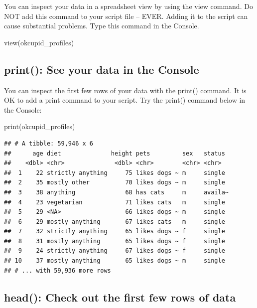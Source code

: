 \documentclass[
]{krantz}
\makeatletter
\newenvironment{Shaded}{\begin{snugshade}}{\end{snugshade}}
\newcommand{\FunctionTok}[1]{\textcolor[rgb]{0,0,0}{#1}}
\newcommand{\NormalTok}[1]{#1}
\newenvironment{kframe}{%
\medskip{}
\setlength{\fboxsep}{.8em}
 \def\at@end@of@kframe{}%
 \ifinner\ifhmode%
  \def\at@end@of@kframe{\end{minipage}}%
  \begin{minipage}{\columnwidth}%
 \fi\fi%
 \def\FrameCommand##1{\hskip\@totalleftmargin \hskip-\fboxsep
 \colorbox{shadecolor}{##1}\hskip-\fboxsep
     \hskip-\linewidth \hskip-\@totalleftmargin \hskip\columnwidth}%
 \MakeFramed {\advance\hsize-\width
   \@totalleftmargin\z@ \linewidth\hsize
   \@setminipage}}%
 {\par\unskip\endMakeFramed%
 \at@end@of@kframe}
\renewenvironment{Shaded}{\begin{kframe}}{\end{kframe}}
\makeatother
\begin{document}
You can inspect your data in a spreadsheet view by using the view command. Do NOT add this command to your script file -- EVER. Adding it to the script can cause substantial problems. Type this command in the Console.

\begin{Shaded}
\begin{Highlighting}[]
\FunctionTok{view}\NormalTok{(okcupid\_profiles)}
\end{Highlighting}
\end{Shaded}

\hypertarget{print-see-your-data-in-the-console}{%
\subsection{print(): See your data in the Console}\label{print-see-your-data-in-the-console}}

You can inspect the first few rows of your data with the print() command. It is OK to add a print command to your script. Try the print() command below in the Console:

\begin{Shaded}
\begin{Highlighting}[]
\FunctionTok{print}\NormalTok{(okcupid\_profiles)}
\end{Highlighting}
\end{Shaded}

\begin{verbatim}
## # A tibble: 59,946 x 6
##      age diet              height pets         sex   status 
##    <dbl> <chr>              <dbl> <chr>        <chr> <chr>  
##  1    22 strictly anything     75 likes dogs ~ m     single 
##  2    35 mostly other          70 likes dogs ~ m     single 
##  3    38 anything              68 has cats     m     availa~
##  4    23 vegetarian            71 likes cats   m     single 
##  5    29 <NA>                  66 likes dogs ~ m     single 
##  6    29 mostly anything       67 likes cats   m     single 
##  7    32 strictly anything     65 likes dogs ~ f     single 
##  8    31 mostly anything       65 likes dogs ~ f     single 
##  9    24 strictly anything     67 likes dogs ~ f     single 
## 10    37 mostly anything       65 likes dogs ~ m     single 
## # ... with 59,936 more rows
\end{verbatim}

\hypertarget{head-check-out-the-first-few-rows-of-data}{%
\subsection{head(): Check out the first few rows of data}\label{head-check-out-the-first-few-rows-of-data}}
\end{document}
